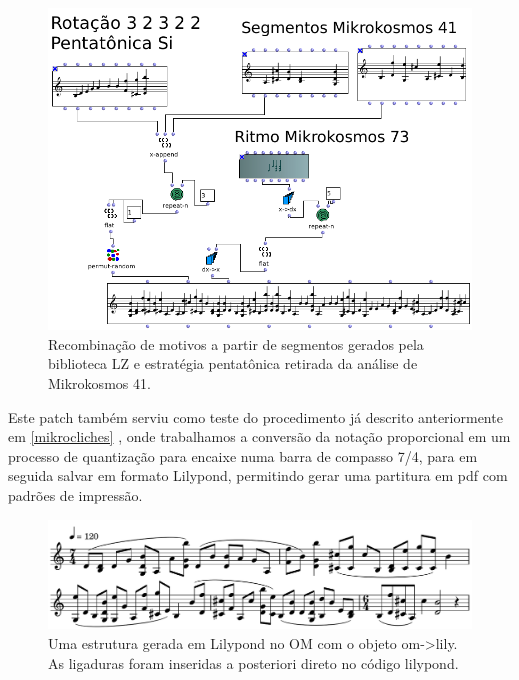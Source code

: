 \documentclass[
	12pt,				%
	openright,			%
	twoside,			%
	a4paper,			%
	english,			%
	french,				%
	spanish,			%
	brazil				%
	]{abntex2}
\begin{document}
\begin{figure}[!h]
	\caption{\label{fig_grafico}Recombinação de motivos a partir de segmentos gerados pela biblioteca LZ e estratégia pentatônica retirada da análise de Mikrokosmos 41. }
	\begin{center}
	    \includegraphics[scale=0.4]{OMPD/Recombina_Mikros.png}
	\end{center}
\end{figure}

Este patch também serviu como teste do procedimento já descrito anteriormente em \autoref{mikrocliches} , onde trabalhamos a conversão da notação proporcional em um processo de quantização para encaixe numa barra de compasso 7/4, para em seguida salvar em formato Lilypond, permitindo gerar uma partitura em pdf com padrões de impressão.


\begin{figure}[!h]
	\caption{\label{fig_grafico}Uma estrutura gerada em Lilypond no OM com o objeto om->lily. As ligaduras foram inseridas a posteriori direto no código lilypond. }
	\begin{center}
	    \includegraphics[scale=0.3]{OMPD/recombinadoLILY.png}
	\end{center}
\end{figure}
\end{document}
